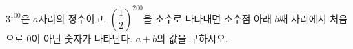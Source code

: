 $3^{100}$은 $a$자리의 정수이고, $\left(\dfrac{1}{2}\right)^{200}$을 소수로 나타내면 소수점 아래 $b$째 자리에서 처음으로 $0$이 아닌 숫자가 나타난다. $a+b$의 값을 구하시오. 
